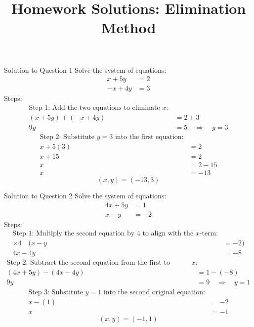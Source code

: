 \documentclass{beamer}
\title{Homework Solutions: Elimination Method}
\author{}
\date{}
\begin{document}
\begin{frame}
    \titlepage
\end{frame}

\begin{frame}{Solution to Question 1}
Solve the system of equations:
\[
\begin{aligned}
    x + 5y &= 2 \\
    -x + 4y &= 3
\end{aligned}
\]
Steps:
\[
\begin{aligned}
    \text{Step 1: Add the two equations to eliminate } x: \\
    (x + 5y) + (-x + 4y) &= 2 + 3 \\
    9y &= 5 \quad \Rightarrow \quad y = 3
\end{aligned}
\]
\[
\begin{aligned}
    \text{Step 2: Substitute } y = 3 \text{ into the first equation:} \\
    x + 5(3) &= 2 \\
    x + 15 &= 2 \\
    x &= 2 - 15 \\
    x &= -13
\end{aligned}
\]
\[
(x, y) = (-13, 3)
\]
\end{frame}

\begin{frame}{Solution to Question 2}
Solve the system of equations:
\[
\begin{aligned}
    4x + 5y &= 1 \\
    x - y &= -2
\end{aligned}
\]
Steps:
\[
\begin{aligned}
    \text{Step 1: Multiply the second equation by 4 to align with the } x \text{-term:} \\
    \times 4 \quad (x - y &= -2) \\
    4x - 4y &= -8
\end{aligned}
\]
\[
\begin{aligned}
    \text{Step 2: Subtract the second equation from the first to eliminate } x: \\
    (4x + 5y) - (4x - 4y) &= 1 - (-8) \\
    9y &= 9 \quad \Rightarrow \quad y = 1
\end{aligned}
\]
\[
\begin{aligned}
    \text{Step 3: Substitute } y = 1 \text{ into the second original equation:} \\
    x - (1) &= -2 \\
    x &= -1
\end{aligned}
\]
\[
(x, y) = (-1, 1)
\]
\end{frame}
\end{document}
